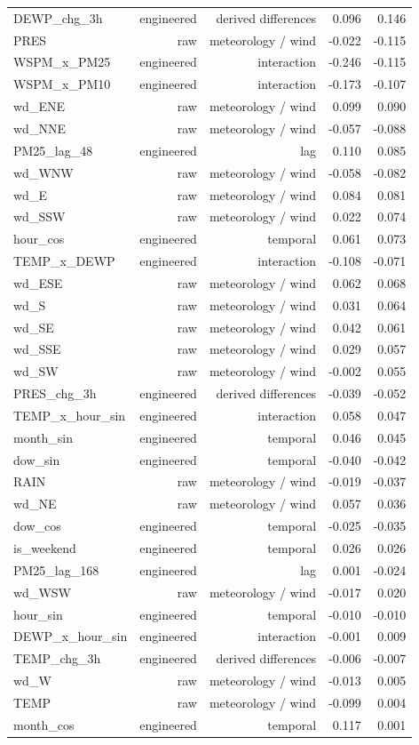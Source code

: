 \begin{table}[t]
\begin{tabular}{lrrrr}
DEWP\_chg\_3h & engineered & derived differences & 0.096 & 0.146 \\
PRES & raw & meteorology / wind & -0.022 & -0.115 \\
WSPM\_x\_PM25 & engineered & interaction & -0.246 & -0.115 \\
WSPM\_x\_PM10 & engineered & interaction & -0.173 & -0.107 \\
wd\_ENE & raw & meteorology / wind & 0.099 & 0.090 \\
wd\_NNE & raw & meteorology / wind & -0.057 & -0.088 \\
PM25\_lag\_48 & engineered & lag & 0.110 & 0.085 \\
wd\_WNW & raw & meteorology / wind & -0.058 & -0.082 \\
wd\_E & raw & meteorology / wind & 0.084 & 0.081 \\
wd\_SSW & raw & meteorology / wind & 0.022 & 0.074 \\
hour\_cos & engineered & temporal & 0.061 & 0.073 \\
TEMP\_x\_DEWP & engineered & interaction & -0.108 & -0.071 \\
wd\_ESE & raw & meteorology / wind & 0.062 & 0.068 \\
wd\_S & raw & meteorology / wind & 0.031 & 0.064 \\
wd\_SE & raw & meteorology / wind & 0.042 & 0.061 \\
wd\_SSE & raw & meteorology / wind & 0.029 & 0.057 \\
wd\_SW & raw & meteorology / wind & -0.002 & 0.055 \\
PRES\_chg\_3h & engineered & derived differences & -0.039 & -0.052 \\
TEMP\_x\_hour\_sin & engineered & interaction & 0.058 & 0.047 \\
month\_sin & engineered & temporal & 0.046 & 0.045 \\
dow\_sin & engineered & temporal & -0.040 & -0.042 \\
RAIN & raw & meteorology / wind & -0.019 & -0.037 \\
wd\_NE & raw & meteorology / wind & 0.057 & 0.036 \\
dow\_cos & engineered & temporal & -0.025 & -0.035 \\
is\_weekend & engineered & temporal & 0.026 & 0.026 \\
PM25\_lag\_168 & engineered & lag & 0.001 & -0.024 \\
wd\_WSW & raw & meteorology / wind & -0.017 & 0.020 \\
hour\_sin & engineered & temporal & -0.010 & -0.010 \\
DEWP\_x\_hour\_sin & engineered & interaction & -0.001 & 0.009 \\
TEMP\_chg\_3h & engineered & derived differences & -0.006 & -0.007 \\
wd\_W & raw & meteorology / wind & -0.013 & 0.005 \\
TEMP & raw & meteorology / wind & -0.099 & 0.004 \\
month\_cos & engineered & temporal & 0.117 & 0.001 \\
\bottomrule
\end{tabular}
\end{table}

